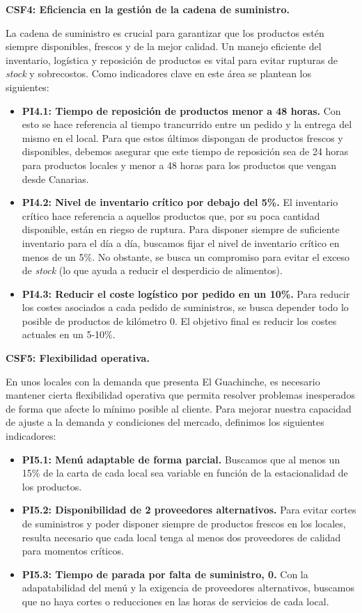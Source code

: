 \documentclass[12pt]{opticajnl}
\begin{document}
\textbf{CSF4: Eficiencia en la gestión de la cadena de suministro.}

La cadena de suministro es crucial para garantizar que los productos estén siempre disponibles, frescos y de la mejor calidad. Un manejo eficiente del inventario, logística y reposición de productos es vital para evitar rupturas de \textit{stock} y sobrecostos. Como indicadores clave en este área se plantean los siguientes:

\begin{itemize}
    \item \textbf{PI4.1: Tiempo de reposición de productos menor a 48 horas.} Con esto se hace referencia al tiempo trancurrido entre un pedido y la entrega del mismo en el local. Para que estos últimos dispongan de productos frescos y disponibles, debemos asegurar que este tiempo de reposición sea de 24 horas para productos locales y menor a 48 horas para los productos que vengan desde Canarias. 
    \item \textbf{PI4.2: Nivel de inventario crítico por debajo del 5\%.} El inventario crítico hace referencia a aquellos productos que, por su poca cantidad disponible, están en riegso de ruptura. Para disponer siempre de suficiente inventario para el día a día, buscamos fijar el nivel de inventario crítico en menos de un 5\%. No obstante, se busca un compromiso para evitar el exceso de \textit{stock} (lo que ayuda a reducir el desperdicio de alimentos).
    \item \textbf{PI4.3: Reducir el coste logístico por pedido en un 10\%.} Para reducir los costes asociados a cada pedido de suministros, se busca depender todo lo posible de productos de kilómetro 0. El objetivo final es reducir los costes actuales en un 5-10\%.
\end{itemize}

\textbf{CSF5: Flexibilidad operativa.}

En unos locales con la demanda que presenta El Guachinche, es necesario mantener cierta flexibilidad operativa que permita resolver problemas inesperados de forma que afecte lo mínimo posible al cliente. Para mejorar nuestra capacidad de ajuste a la demanda y condiciones del mercado, definimos los siguientes indicadores:

\begin{itemize}
    \item \textbf{PI5.1: Menú adaptable de forma parcial.} Buscamos que al menos un 15\% de la carta de cada local sea variable en función de la estacionalidad de los productos. 
    \item \textbf{PI5.2: Disponibilidad de 2 proveedores alternativos.} Para evitar cortes de suministros y poder disponer siempre de productos frescos en los locales, resulta necesario que cada local tenga al menos dos proveedores de calidad para momentos críticos.
    \item \textbf{PI5.3: Tiempo de parada por falta de suministro, 0.} Con la adapatabilidad del menú y la exigencia de proveedores alternativos, buscamos que no haya cortes o reducciones en las horas de servicios de cada local.    
\end{itemize}
\end{document}
